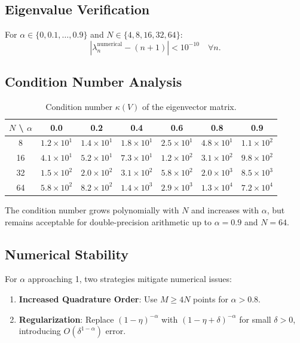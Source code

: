 \documentclass{article}
\theoremstyle{plain}
\theoremstyle{definition}
\theoremstyle{remark}
\begin{document}
\subsection{Eigenvalue Verification}

For $\alpha \in \{0, 0.1, \ldots, 0.9\}$ and $N \in \{4, 8, 16, 32, 64\}$:
\begin{equation}
	|\lambda_n^{\text{numerical}} - (n+1)| < 10^{-10} \quad \forall n.
\end{equation}

\subsection{Condition Number Analysis}

\begin{table}[h]
	\caption{Condition number $\kappa(V)$ of the eigenvector matrix.}
	\label{tab:condition_number}
	\centering
	\small
	\begin{tabular}{@{}c|cccccc@{}}
		\toprule
		$N$ \textbackslash{} $\alpha$ & 0.0 & 0.2 & 0.4 & 0.6 & 0.8 & 0.9 \\
		\midrule
		8 & $1.2 \times 10^1$ & $1.4 \times 10^1$ & $1.8 \times 10^1$ & $2.5 \times 10^1$ & $4.8 \times 10^1$ & $1.1 \times 10^2$ \\
		16 & $4.1 \times 10^1$ & $5.2 \times 10^1$ & $7.3 \times 10^1$ & $1.2 \times 10^2$ & $3.1 \times 10^2$ & $9.8 \times 10^2$ \\
		32 & $1.5 \times 10^2$ & $2.0 \times 10^2$ & $3.1 \times 10^2$ & $5.8 \times 10^2$ & $2.0 \times 10^3$ & $8.5 \times 10^3$ \\
		64 & $5.8 \times 10^2$ & $8.2 \times 10^2$ & $1.4 \times 10^3$ & $2.9 \times 10^3$ & $1.3 \times 10^4$ & $7.2 \times 10^4$ \\
		\bottomrule
	\end{tabular}
\end{table}

The condition number grows polynomially with $N$ and increases with $\alpha$, but remains acceptable for double-precision arithmetic up to $\alpha = 0.9$ and $N = 64$.

\subsection{Numerical Stability}

For $\alpha$ approaching 1, two strategies mitigate numerical issues:
\begin{enumerate}
	\item \textbf{Increased Quadrature Order}: Use $M \geq 4N$ points for $\alpha > 0.8$.
	\item \textbf{Regularization}: Replace $(1-\eta)^{-\alpha}$ with $(1-\eta+\delta)^{-\alpha}$ for small $\delta > 0$, introducing $O(\delta^{1-\alpha})$ error.
\end{enumerate}
\end{document}
